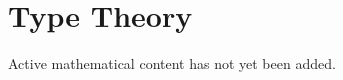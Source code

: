 
\section{Type Theory}

\begin{remark*}
Active mathematical content has not yet been added.
\end{remark*}

